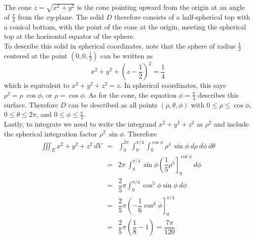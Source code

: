 {The cone $z = \sqrt{x^2 + y^2}$ is the cone pointing upward from the origin at an angle of $\frac{\pi}{4}$ from the $xy$-plane. The solid $D$ therefore consists of a half-spherical top with a conical bottom, with the point of the cone at the origin, meeting the spherical top at the horizontal equator of the sphere.\\

To describe this solid in spherical coordinates, note that the sphere of radius $\frac{1}{2}$ centered at the point $\left( 0,0,\frac{1}{2}\right)$ can be written as $$x^2 + y^2 + \left( z - \frac{1}{2}\right)^2 = \frac{1}{4}$$ which is equivalent to $x^2 + y^2 + z^2 = z$. In spherical coordinates, this says $\rho^2 = \rho \: \cos\phi$, or $\rho = \cos\phi$.  As for the cone, the equation $\phi = \frac{\pi}{4}$ describes this surface.  Therefore $D$ can be described as all points $\left( \rho, \theta,\phi\right)$ with $0 \leq \rho \leq \cos\phi$, $0 \leq \theta \leq 2\pi$, and $0 \leq \phi \leq \frac{\pi}{4}$.  \\

Lastly, to integrate we need to write the integrand $x^2 + y^2 + z^2$ as $\rho^2$ and include the spherical integration factor $\rho^2 \: \sin\phi$.  Therefore
\begin{eqnarray*}
\iiint_E x^2 + y^2 + z^2 \: dV & = & \int_0^{2\pi} \int_0^{\pi/4} \int_0^{\cos\phi} \rho^4 \: \sin\phi \: d\rho \: d\phi \: d\theta \\
 & = & 2\pi \: \int_0^{\pi/4} \sin\phi \left( \dfrac{1}{5} \rho^5 \right]_{0}^{\cos\phi} \: d\phi \\
 & = & \dfrac{2}{5}\pi \int_0^{\pi/4} \cos^5\phi \sin\phi \: d\phi \\
 & = & \dfrac{2}{5}\pi \left( -\dfrac{1}{6}\cos^6\phi \right]_{0}^{\pi/4} \\
 & = & \dfrac{2}{5}\pi \left( \dfrac{1}{8} - 1 \right) = \dfrac{7\pi}{120} \\
\end{eqnarray*}
}\\


